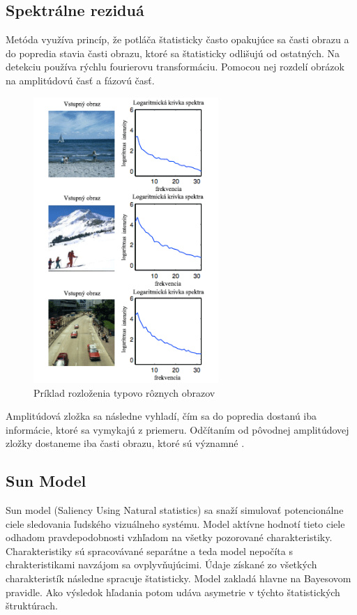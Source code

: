 \subsection{Spektrálne reziduá}
Metóda využíva princíp, že potláča štatisticky často opakujúce sa časti obrazu a do popredia stavia časti obrazu, ktoré sa štatisticky odlišujú od ostatných.
Na detekciu používa rýchlu fourierovu transformáciu.
Pomocou nej rozdelí obrázok na amplitúdovú časť a fázovú časť.

\begin{figure}[H]
  \centering
  \includegraphics[width=7cm]{pics/spectral-img.png}
  \caption{Príklad rozloženia typovo rôznych obrazov\cite{spectral-rezidual}}\label{wrap-fig:2}
\end{figure}
\vspace{10mm}

Amplitúdová zložka sa následne vyhladí, čím sa do popredia dostanú iba informácie, ktoré sa vymykajú z priemeru.
Odčítaním od pôvodnej amplitúdovej zložky dostaneme iba časti obrazu, ktoré sú významné \cite{spectral-rezidual}.
\subsection{Sun Model}
Sun model (Saliency Using Natural statistics) sa snaží simulovať potencionálne ciele sledovania ľudského vizuálneho systému.
Model aktívne hodnotí tieto ciele odhadom pravdepodobnosti vzhľadom na všetky pozorované charakteristiky.
Charakteristiky sú spracovávané separátne a teda model nepočíta s chrakteristikami navzájom sa ovplyvňujúcimi.
Údaje získané zo všetkých charakteristík následne spracuje štatisticky.
Model zakladá hlavne na Bayesovom pravidle.
Ako výsledok hľadania potom udáva asymetrie v týchto štatistických štruktúrach\cite{sun-1}.
